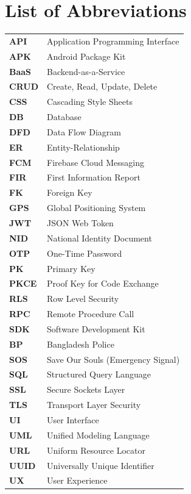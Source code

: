 \documentclass[12pt, a4paper, twoside]{report}
\begin{document}
\chapter*{List of Abbreviations}
\begin{table}[ht]
\begin{tabularx}{\textwidth}{lX}
\textbf{API} & Application Programming Interface \\
\textbf{APK} & Android Package Kit \\
\textbf{BaaS} & Backend-as-a-Service \\
\textbf{CRUD} & Create, Read, Update, Delete \\
\textbf{CSS} & Cascading Style Sheets \\
\textbf{DB} & Database \\
\textbf{DFD} & Data Flow Diagram \\
\textbf{ER} & Entity-Relationship \\
\textbf{FCM} & Firebase Cloud Messaging \\
\textbf{FIR} & First Information Report \\
\textbf{FK} & Foreign Key \\
\textbf{GPS} & Global Positioning System \\
\textbf{JWT} & JSON Web Token \\
\textbf{NID} & National Identity Document \\
\textbf{OTP} & One-Time Password \\
\textbf{PK} & Primary Key \\
\textbf{PKCE} & Proof Key for Code Exchange \\
\textbf{RLS} & Row Level Security \\
\textbf{RPC} & Remote Procedure Call \\
\textbf{SDK} & Software Development Kit \\
\textbf{BP} & Bangladesh Police \\
\textbf{SOS} & Save Our Souls (Emergency Signal) \\
\textbf{SQL} & Structured Query Language \\
\textbf{SSL} & Secure Sockets Layer \\
\textbf{TLS} & Transport Layer Security \\
\textbf{UI} & User Interface \\
\textbf{UML} & Unified Modeling Language \\
\textbf{URL} & Uniform Resource Locator \\
\textbf{UUID} & Universally Unique Identifier \\
\textbf{UX} & User Experience \\
\end{tabularx}
\end{table}
\clearpage
\end{document}
